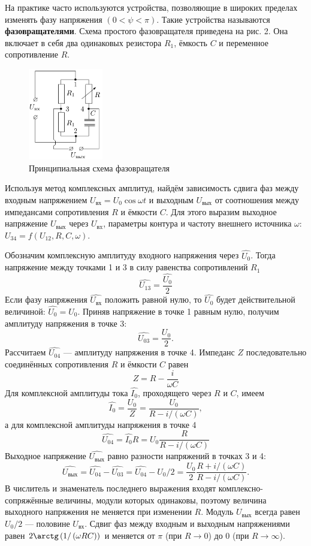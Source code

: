 \documentclass[12pt]{article}
\begin{document}
\par
	На практике часто используются устройства, позволяющие в широких пределах изменять фазу напряжения $\left(0 < \psi < \pi\right)$. Такие устройства называются {\bf фазовращателями}. Схема простого фазовращателя приведена на рис. 2. Она включает в себя два одинаковых резистора 
$R_1$, ёмкость $C$ и переменное сопротивление $R$.
\begin{figure}[h!]
	\centering
	\includegraphics[height=40mm]{image2.png}
	\caption{Принципиальная схема фазовращателя}
	\label{image2}
\end{figure}
\par
	Используя метод комплексных амплитуд, найдём зависимость сдвига фаз между входным напряжением $U_\text{вх} = U_0 \cos \omega t$ и выходным $U_\text{вых}$ от соотношения между импедансами сопротивления $R$ и ёмкости $C$. Для этого выразим выходное напряжение $U_\text{вых}$ через $U_\text{вx}$, параметры контура и частоту внешнего источника $\omega$: $U_\text{34}=f\left(U_\text{12}, R, C, \omega\right)$.
\par
	Обозначим комплексную амплитуду входного напряжения через $\widehat{U_0}$. Тогда напряжение между точками 1 и 3 в силу равенства сопротивлений $R_1$
\[
 	\widehat{U_\text{13}}=\frac{\widehat{U_0}}{2}
\]	
Если фазу напряжения $\widehat{U_\text{вх}}$ положить равной нулю, то $\widehat{U_0}$ будет действительной величиной: $\widehat{U_0}=U_0$. Приняв напряжение в точке 1 равным нулю, получим амплитуду напряжения в точке 3:
\[
	\widehat{U_\text{03}}=\frac{U_0}{2}.
\]
Рассчитаем $\widehat{U_\text{04}}$ --- амплитуду напряжения в точке 4. Импеданс $Z$ последовательно соединённых сопротивления $R$ и ёмкости $C$ равен
\[
	Z = R - \frac{i}{\omega C}
\]	
Для комплексной амплитуды тока $\widehat{I_0}$, проходящего через $R$ и $C$, имеем
\[
	\widehat{I_0}=\frac{U_0}{Z}=\frac{U_0}{R-i/\left(\omega C\right)},
\]	
а для комплексной амплитуды напряжения в точке 4
\[
	\widehat{U_\text{04}}=\widehat{I_0}R=U_0 \frac{R}{R - i/\left(\omega C\right)}
\]	
Выходное напряжение $\widehat{U_\text{вых}}$ равно разности напряжений в точках 3 и 4:
\[
	\widehat{U_\text{вых}}= \widehat{U_\text{04}}-\widehat{U_\text{03}}=\widehat{U_\text{04}} - U_0 / 2 = \frac{U_0}{2} \frac{R + i/\left(\omega C\right)}{R - i/\left(\omega C\right)}.	
\]	
В числитель и знаменатель последнего выражения входят комплексно-сопряжённые величины, модули которых одинаковы, поэтому величина выходного напряжения не меняется при изменении $R$. Модуль $U_\text{вых}$ всегда равен $U_0 / 2$ --- половине $U_\text{вх}$. Сдвиг фаз между входным и выходным напряжениями равен $2 \arctg\left(1 / \left(\omega R C\right)\right)$ и меняется от $\pi$ (при $R \to 0$) до $0$ (при $R \to \infty$).	
\end{document}
